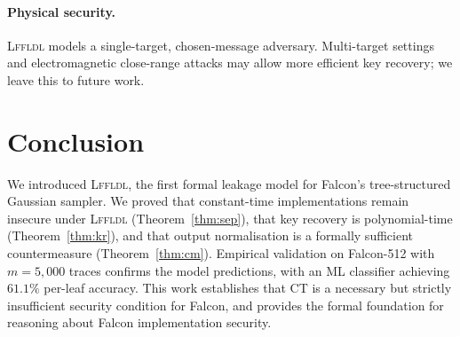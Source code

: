 \documentclass[sigconf,anonymous]{acmart}
\begin{document}
\paragraph{Physical security.}
\textsc{Lffldl} models a single-target, chosen-message adversary.  Multi-target
settings and electromagnetic close-range attacks may allow more efficient key
recovery; we leave this to future work.

\section{Conclusion}

We introduced \textsc{Lffldl}, the first formal leakage model for Falcon's
tree-structured Gaussian sampler.  We proved that constant-time implementations
remain insecure under \textsc{Lffldl} (Theorem~\ref{thm:sep}), that key
recovery is polynomial-time (Theorem~\ref{thm:kr}), and that output
normalisation is a formally sufficient countermeasure (Theorem~\ref{thm:cm}).
Empirical validation on Falcon-512 with $m=5{,}000$ traces confirms the model
predictions, with an ML classifier achieving $61.1\%$ per-leaf accuracy.
This work establishes that CT is a necessary but strictly insufficient security
condition for Falcon, and provides the formal foundation for reasoning about
Falcon implementation security.


\end{document}
